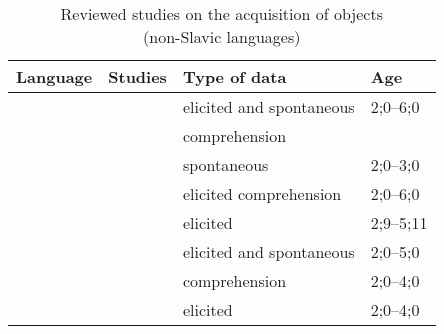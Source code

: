 \documentclass[output=paper,modfonts,newtxmath,hidelinks,]{langscibook}
\begin{document}
\begin{table}
\captionsetup{format=hang}
	\caption{Reviewed studies on the acquisition of objects\\(non-Slavic languages)}
	\footnotesize
    \begin{tabularx}{\textwidth}{p{2cm}Q@{}ll}
    \lsptoprule
     \textbf{Language} & \textbf{Studies} & \textbf{Type of data} & \textbf{Age}\\ \midrule
      & \citet{Hamann-etal1996,Jakubowicz-Rigaut2000,Perez-Leroux-etal2008} & elicited and spontaneous  & 2;0--6;0\vspace{5pt}\\ 
      &  \citet{Grueter2006} & comprehension  &\vspace{10pt}\\
 	
      & \citet{Bloom1990} & spontaneous  & 2;0--3;0\vspace{5pt}\\
	    & \citet{Grueter2006} & elicited comprehension  & 2;0--6;0\vspace{5pt}\\ 
	    & \citet{Perez-Leroux-etal2008} & elicited  & 2;9--5;11\vspace{10pt}\\
     
       & \citet{Wexler-etal2004,Stiasny2006,Castilla-etal2008} & elicited and spontaneous  & 2;0--5;0\vspace{5pt}\\ 
       & \citet{Mateu2015} & comprehension  & 2;0--4;0\vspace{10pt}\\
     
       & \citet{Wexler-etal2004} & elicited  & 2;0--4;0\vspace{10pt}\\
     

\end{tabularx}
\end{table}
\end{document}
